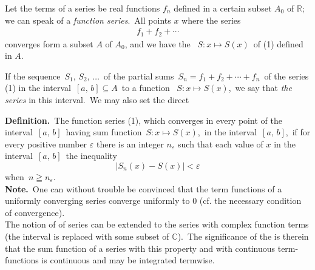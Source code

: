 \documentclass[12pt]{article}
\begin{document}
Let the terms of a series be real functions $f_n$ defined in a certain subset $A_0$ of $\mathbb{R}$; we can speak of a {\em function series}.\, All points $x$ where the series
 \begin{align}
                  f_1+f_2+\cdots
 \end{align}
converges form a subset $A$ of $A_0$, and we have the {\em {}}\, $S\!:x\mapsto S(x)$\, of (1) defined in $A$.

If the sequence\, $S_1,\,S_2,\,\ldots$\, of the partial sums\, 
$S_n = f_1\!+\!f_2\!+\cdots+\!f_n$\, of the series (1)  in the interval\, $[a,\,b] \subseteq{A}$\, to a function \, $S\!:x\mapsto S(x)$,\, we say that {\em the series } in this interval.\, We may also set the direct

\textbf{Definition.}\, The function series (1), which converges in every point of the interval\, $[a,\,b]$\, having sum function\, $S:x\mapsto S(x)$,\, 
{\em {}} in the interval\, $[a,\,b]$,\, if for every positive number $\varepsilon$ there is an integer $n_\varepsilon$ such that each value of $x$ in the interval\, $[a,\,b]$\,  the inequality
          $$|S_n(x)-S(x)| < \varepsilon$$
when\, $n \geqq n_\varepsilon$.\\

\textbf{Note.}\, One can without trouble be convinced that the term functions of a uniformly converging series converge uniformly to 0 (cf. the necessary condition of convergence).\\

The notion of  of series can be extended to the series with complex function terms (the interval is replaced with some subset of $\mathbb{C}$).\, The significance of the  is therein that the sum function of a series with this property and with continuous term-functions is continuous and may be integrated termwise.
\end{document}
